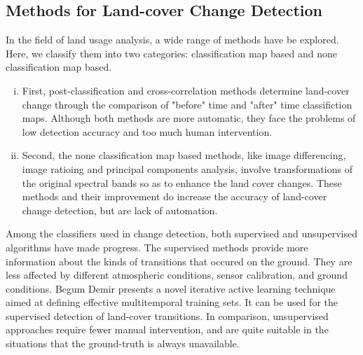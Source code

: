 \documentclass{elsart}
\begin{document}
\subsection{Methods for Land-cover Change Detection}
In the field of land usage analysis, a wide range of methods\cite{SINGH1989} have be explored.
Here, we classify them into two categories: classification map based and none classification map based.
\begin{enumerate}[(i)]
\item First, post-classification and cross-correlation methods determine land-cover change through the comparison of "before" time and "after" time classifiction maps. 
Although both methods are more automatic, they face the problems of low detection accuracy and too much human intervention.
\item Second, the none classification map based methods, like image differencing, image ratioing and principal components analysis, involve transformations of the original spectral bands so as to enhance the land cover changes.
These methods and their improvement do increase the accuracy of land-cover change detection, but are lack of automation. 
\end{enumerate}
\par

Among the classifiers used in change detection, both supervised and unsupervised algorithms have made progress.
The supervised methods provide more information about the kinds of transitions that occured on the ground.
They are less affected by different atmospheric conditions, sensor calibration, and ground conditions\cite{Demir2011}\cite{Clifton2003}.
Begum Demir\cite{Demir2011} presents a novel iterative active learning technique aimed at defining effective multitemporal training sets.
It can be used for the supervised detection of land-cover transitions.
In comparison, unsupervised approaches require fewer manual intervention\cite{Patra2006}\cite{Patra2007}\cite{Chen2008}, and are quite suitable in the situations that the ground-truth is always unavailable.
\par
\end{document}

